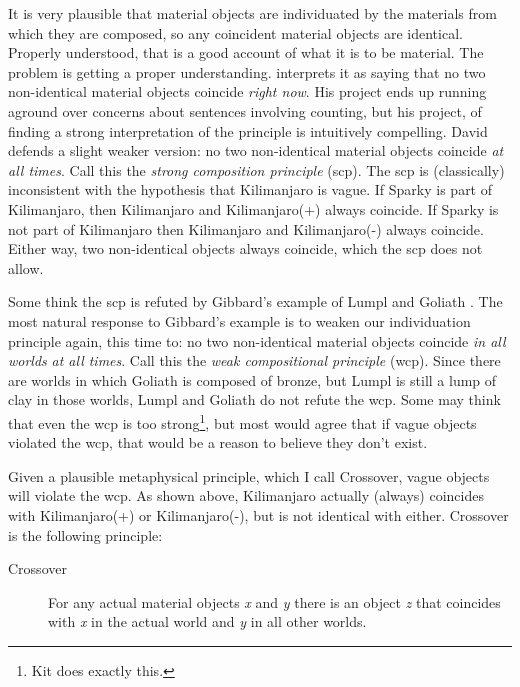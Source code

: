 It is very plausible that material objects are individuated by the materials from which they are composed, so any coincident material objects are identical. Properly understood, that is a good account of what it is to be material. The problem is getting a proper understanding. \citet{Sider1996-SIDATW} interprets it as saying that no two non-identical material objects coincide \textit{right now}. His project ends up running aground over concerns about sentences involving counting, but his project, of finding a strong interpretation of the principle is intuitively compelling. David \cite[Ch. 4]{Lewis1986a} defends a slight weaker version: no two non-identical material objects coincide \textit{at all times}. Call this the \textit{strong composition principle }(scp). The scp is (classically) inconsistent with the hypothesis that Kilimanjaro is vague. If Sparky is part of Kilimanjaro, then Kilimanjaro and Kilimanjaro(+) always coincide. If Sparky is not part of Kilimanjaro then Kilimanjaro and Kilimanjaro(-) always coincide. Either way, two non-identical objects always coincide, which the scp does not allow.

Some think the scp is refuted by Gibbard's example of Lumpl and Goliath \citep{Gibbard1975}. The most natural response to Gibbard's example is to weaken our individuation principle again, this time to: no two non-identical material objects coincide \textit{in all worlds} \textit{at all times}. Call this the \textit{weak compositional principle} (wcp). Since there are worlds in which Goliath is composed of bronze, but Lumpl is still a lump of clay in those worlds, Lumpl and Goliath do not refute the wcp. Some may think that even the wcp is too strong\footnote{Kit \citet{Fine1994} does exactly this.}, but most would agree that if vague objects violated the wcp, that would be a reason to believe they don't exist.

Given a plausible metaphysical principle, which I call Crossover, vague objects will violate the wcp. As shown above, Kilimanjaro actually (always) coincides with Kilimanjaro(+) or Kilimanjaro(-), but is not identical with either. Crossover is the following principle:

\begin{description}
\item[Crossover] For any actual material objects \textit{x} and \textit{y} there is an object \textit{z} that coincides with \textit{x} in the actual world and \textit{y} in all other worlds.
\end{description}

